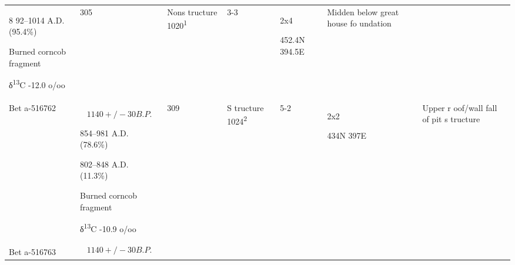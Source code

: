 \documentclass[
  12pt,
]{krantz}
\begin{document}
\begin{longtable}[]{@{}lllllll@{}}
\begin{minipage}[t]{0.12\columnwidth}
8
92--1014
A.D.
(95.4\%)

Burned
corncob
fragment

δ\textsuperscript{13}C
-12.0
o/oo\strut
\end{minipage} & \begin{minipage}[t]{0.07\columnwidth}\raggedright
305\strut
\end{minipage} & \begin{minipage}[t]{0.12\columnwidth}\raggedright
Nons
tructure
1020\textsuperscript{1}\strut
\end{minipage} & \begin{minipage}[t]{0.08\columnwidth}\raggedright
3-3\strut
\end{minipage} & \begin{minipage}[t]{0.12\columnwidth}\raggedright
2x4

452.4N
394.5E\strut
\end{minipage} & \begin{minipage}[t]{0.12\columnwidth}\raggedright
Midden
below
great
house
fo
undation\strut
\end{minipage}\tabularnewline
\begin{minipage}[t]{0.12\columnwidth}\raggedright
Bet
a-516762\strut
\end{minipage} & \begin{minipage}[t]{0.12\columnwidth}\raggedright
\[1140
+/-30
B.P.\]

854--981
A.D.
(78.6\%)

802--848
A.D.
(11.3\%)

Burned
corncob
fragment

δ\textsuperscript{13}C
-10.9
o/oo\strut
\end{minipage} & \begin{minipage}[t]{0.07\columnwidth}\raggedright
309\strut
\end{minipage} & \begin{minipage}[t]{0.12\columnwidth}\raggedright
S
tructure
1024\textsuperscript{2}\strut
\end{minipage} & \begin{minipage}[t]{0.08\columnwidth}\raggedright
5-2\strut
\end{minipage} & \begin{minipage}[t]{0.12\columnwidth}\raggedright
2x2

434N
397E\strut
\end{minipage} & \begin{minipage}[t]{0.12\columnwidth}\raggedright
Upper
r
oof/wall
fall of
pit
s
tructure\strut
\end{minipage}\tabularnewline
\begin{minipage}[t]{0.12\columnwidth}\raggedright
Bet
a-516763\strut
\end{minipage} & \begin{minipage}[t]{0.12\columnwidth}\raggedright
\[1140
+/- 30
B.P.\]


\end{minipage}
\end{longtable}
\end{document}
